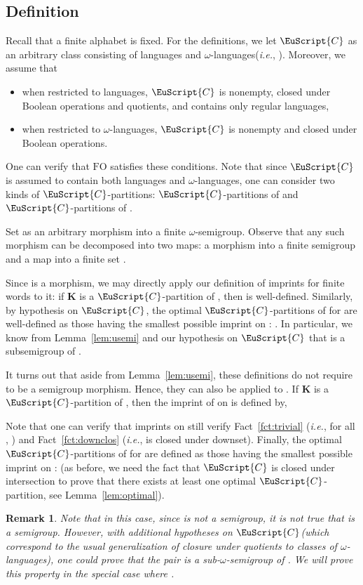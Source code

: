 \documentclass{CSML}
\newcommand\Cs{\ensuremath{\EuScript{C}}\xspace}
\newcommand\Kb{\ensuremath{\mathbf{K}}\xspace}
\newcommand{\fo}{\ensuremath{\text{FO}}\xspace}
\newcommand\ilangs{\ensuremath{\omega}-languages\xspace}
\newcommand\sisemi{sub-\ensuremath{\omega}-semigroup\xspace}
\newcommand\isemi{\ensuremath{\omega}-semigroup\xspace}
\theoremstyle{plain}
\newtheorem{remark}[thm]{Remark}
\begin{document}
\subsection{Definition}

Recall that a finite alphabet  is fixed. For the definitions, we
let \Cs as an arbitrary class consisting of languages and \ilangs (\emph{i.e.}, ). Moreover, we assume that
\begin{itemize}
\item when restricted to languages, \Cs is nonempty, closed
  under Boolean operations and quotients, and contains only regular languages,
\item when restricted to \ilangs, \Cs is nonempty and closed
  under Boolean operations.
\end{itemize}

One can verify that \fo satisfies these conditions. Note that since
\Cs is assumed to contain both languages and \ilangs, one can consider
two kinds of \Cs-partitions: \Cs-partitions of  and
\Cs-partitions of .

Set  as an arbitrary
morphism into a finite \isemi . Observe that any such
morphism  can be decomposed into two maps: a morphism
 into a finite semigroup  and a map
 into a finite set .

Since  is a morphism, we may directly apply our
definition of imprints for finite words to it: if \Kb is a \Cs-partition of , then
 is well-defined. Similarly, by
hypothesis on \Cs, the optimal \Cs-partitions of  for 
are well-defined as those having the smallest possible imprint on
: . In particular, we know from
Lemma~\ref{lem:usemi} and our hypothesis on \Cs that 
is a subsemigroup of .

It turns out that aside from Lemma~\ref{lem:usemi}, these definitions
do not require  to be a semigroup morphism. Hence, they can
also be applied to . If \Kb is a \Cs-partition of ,
then the imprint of  on  is defined by,

Note that one can verify that imprints on  still verify
Fact~\ref{fct:trivial}  (\emph{i.e.}, for all ,
) and
Fact~\ref{fct:downclos} (\emph{i.e.},  is closed
under downset). Finally, the optimal \Cs-partitions of  for
 are defined as those having the smallest possible
imprint on :  (as before, we
need the fact that \Cs is closed under intersection to prove that
there exists at least one optimal \Cs-partition, see
Lemma~\ref{lem:optimal}).

\begin{remark}\label{rem:subisemi}
Note that in this case, since  is not a semigroup, it is not
true that  is a semigroup. However, with
additional hypotheses on \Cs (which correspond to the usual
generalization of closure under quotients to classes of \ilangs), one
could prove that the pair 
is a \sisemi of . We will prove this property
in the special case where .
\end{remark}
\end{document}
